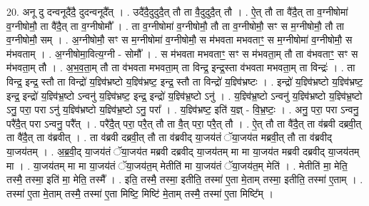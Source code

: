 \documentclass[17pt]{extarticle}
\begin{document}
20. अनू दु दन्वनूदै॑दै॒ दुदन्वनूदै᳚त् । . उदै॑दै॒दुदुदै॒त् तौ ता वै॒दुदुदै॒त् तौ । . ऐ॒त् तौ ता वै॑दै॒त् ता व॒ग्नीषोमा॑ व॒ग्नीषोमौ॒ ता वै॑दै॒त् ता व॒ग्नीषोमौ᳚ । . ता व॒ग्नीषोमा॑ व॒ग्नीषोमौ॒ तौ ता व॒ग्नीषोमौ॒ सꣳ स म॒ग्नीषोमौ॒ तौ ता व॒ग्नीषोमौ॒ सम् । . अ॒ग्नीषोमौ॒ सꣳ स म॒ग्नीषोमा॑ व॒ग्नीषोमौ॒ स म॑भवता मभवताꣳ॒॒ स म॒ग्नीषोमा॑ व॒ग्नीषोमौ॒ स म॑भवताम् । . अ॒ग्नीषोमा॒वित्य॒ग्नी - सोमौ᳚ । . स म॑भवता मभवताꣳ॒॒ सꣳ स म॑भवता॒म् तौ ता व॑भवताꣳ॒॒ सꣳ स म॑भवता॒म् तौ । . अ॒भ॒व॒ता॒म् तौ ता व॑भवता मभवता॒म् ता विन्द्र॒ इन्द्र॒स्ता व॑भवता मभवता॒म् ता विन्द्रः॑ । . ता विन्द्र॒ इन्द्र॒ स्तौ ता विन्द्रो॑ य॒ज्ञ्वि॑भ्रष्टो य॒ज्ञ्वि॑भ्रष्ट॒ इन्द्र॒ स्तौ ता विन्द्रो॑ य॒ज्ञ्वि॑भ्रष्टः । . इन्द्रो॑ य॒ज्ञ्वि॑भ्रष्टो य॒ज्ञ्वि॑भ्रष्ट॒ इन्द्र॒ इन्द्रो॑ य॒ज्ञ्वि॑भ्र॒ष्टो ऽन्वनु॑ य॒ज्ञ्वि॑भ्रष्ट॒ इन्द्र॒ इन्द्रो॑ य॒ज्ञ्वि॑भ्र॒ष्टो ऽनु॑ । . य॒ज्ञ्वि॑भ्र॒ष्टो ऽन्वनु॑ य॒ज्ञ्वि॑भ्रष्टो य॒ज्ञ्वि॑भ्र॒ष्टो ऽनु॒ परा॒ परा ऽनु॑ य॒ज्ञ्वि॑भ्रष्टो य॒ज्ञ्वि॑भ्र॒ष्टो ऽनु॒ परा᳚ । . य॒ज्ञ्वि॑भ्रष्ट॒ इति॑ य॒ज्ञ् - वि॒भ्र॒ष्टः॒ । . अनु॒ परा॒ परा ऽन्वनु॒ परै॑दै॒त् परा ऽन्वनु॒ परै᳚त् । . परै॑दै॒त् परा॒ परै॒त् तौ ता वै॒त् परा॒ परै॒त् तौ । . ऐ॒त् तौ ता वै॑दै॒त् ता व॑ब्रवी दब्रवी॒त् ता वै॑दै॒त् ता व॑ब्रवीत् । . ता व॑ब्रवी दब्रवी॒त् तौ ता व॑ब्रवीद् या॒जय॑तं ॅया॒जय॑त मब्रवी॒त् तौ ता व॑ब्रवीद् या॒जय॑तम् । . अ॒ब्र॒वी॒द् या॒जय॑तं ॅया॒जय॑त मब्रवी दब्रवीद् या॒जय॑तम् मा मा या॒जय॑त मब्रवी दब्रवीद् या॒जय॑तम् मा । . या॒जय॑तम् मा मा या॒जय॑तं ॅया॒जय॑त॒म् मेतीति॑ मा या॒जय॑तं ॅया॒जय॑त॒म् मेति॑ । . मेतीति॑ मा॒ मेति॒ तस्मै॒ तस्मा॒ इति॑ मा॒ मेति॒ तस्मै᳚ । . इति॒ तस्मै॒ तस्मा॒ इतीति॒ तस्मा॑ ए॒ता मे॒ताम् तस्मा॒ इतीति॒ तस्मा॑ ए॒ताम् । . तस्मा॑ ए॒ता मे॒ताम् तस्मै॒ तस्मा॑ ए॒ता मिष्टि॒ मिष्टि॑ मे॒ताम् तस्मै॒ तस्मा॑ ए॒ता मिष्टि᳚म् । \newline
\end{document}

